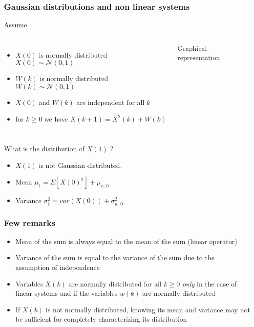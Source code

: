 \begin{frame}
	\frametitle{Gaussian distributions and non linear systems}
	Assume 
	\begin{columns}
		\begin{itemize}
			\item $X(0)$ is normally distributed $X(0)\sim\mathcal{N}(0, 1)$
			\item $W(k)$ is normally distributed $W(k)\sim\mathcal{N}(0, 1)$
			\item $X(0)$ and $W(k)$ are independent for all $k$
			\item for $k\geq0$ we have $X(k+1) =X^2(k) + W(k)$
		\end{itemize}	
		\begin{block}{Graphical representation}
		\end{block}
	\end{columns}
	
	\vspace*{0.5em}
	
	 What is the distribution of $X(1)$ ?
	\begin{itemize}
		\item $X(1)$ is not Gaussian distributed.
		\item Mean $\mu_1=E[X(0)^2]+\mu_{w,0}$
		\item Variance $\sigma_1^2=var(X(0))+\sigma_{w,0}^2$
	\end{itemize}
\end{frame}

\begin{frame}
	\frametitle{Few remarks}
	\begin{itemize}
		\setlength\itemsep{1.5em}
		\item Mean of the sum is always equal to the mean of the sum (linear operator)
		\item Variance of the sum is equal to the variance of the sum due to the assumption of independence
		\item Variables $X(k)$ are normally distributed for all $k\geq0$ \emph{only} in the case of linear systems and if the variables $w(k)$ are normally distributed
		\item If $X(k)$ is not normally distributed, knowing its mean and variance may not be sufficient for completely characterizing its distribution
	\end{itemize}  
\end{frame}

